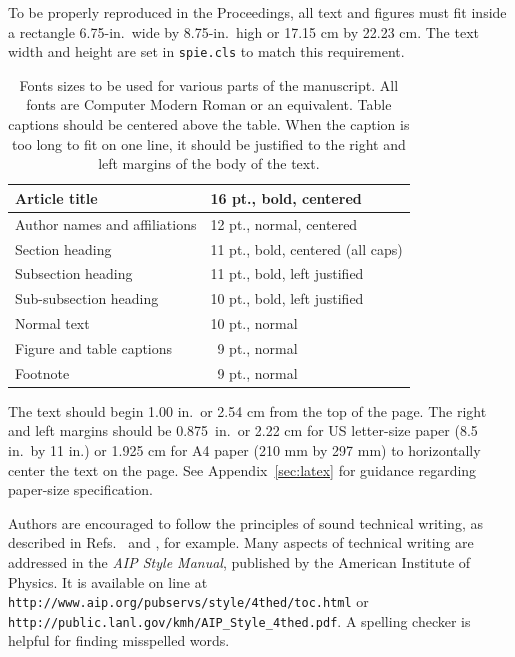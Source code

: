 \documentclass[a4paper]{spie}  %
\begin{document}
To be properly reproduced in the Proceedings, all text and figures must fit inside a rectangle 6.75-in.\ wide by 8.75-in.\ high or 17.15 cm by 22.23 cm.  The text width and height are set in {\tt spie.cls} to match this requirement.
\begin{table}[h]
\caption{Fonts sizes to be used for various parts of the manuscript.  All fonts are Computer Modern Roman or an equivalent.  Table captions should be centered above the table.  When the caption is too long to fit on one line, it should be justified to the right and left margins of the body of the text.} 
\label{tab:fonts}
\begin{center}       
\begin{tabular}{|l|l|} %
\hline
\rule[-1ex]{0pt}{3.5ex}  Article title & 16 pt., bold, centered  \\
\hline
\rule[-1ex]{0pt}{3.5ex}  Author names and affiliations & 12 pt., normal, centered   \\
\hline
\rule[-1ex]{0pt}{3.5ex}  Section heading & 11 pt., bold, centered (all caps)  \\
\hline
\rule[-1ex]{0pt}{3.5ex}  Subsection heading & 11 pt., bold, left justified  \\
\hline
\rule[-1ex]{0pt}{3.5ex}  Sub-subsection heading & 10 pt., bold, left justified  \\
\hline
\rule[-1ex]{0pt}{3.5ex}  Normal text & 10 pt., normal  \\
\hline
\rule[-1ex]{0pt}{3.5ex}  Figure and table captions & \, 9 pt., normal \\
\hline
\rule[-1ex]{0pt}{3.5ex}  Footnote & \, 9 pt., normal \\
\hline 
\end{tabular}
\end{center}
\end{table} 
The text should begin 1.00 in.\ or 2.54 cm from the top of the page.  The right and left margins should be 0.875~in.\ or 2.22 cm for US letter-size paper (8.5 in.\ by 11 in.) or 1.925 cm for A4 paper (210 mm by 297 mm) to horizontally center the text on the page.  See Appendix~\ref{sec:latex} for guidance regarding paper-size specification. 

Authors are encouraged to follow the principles of sound technical writing, as described in Refs.~ and , for example.  Many aspects of technical writing are addressed in the {\em AIP Style Manual}, published by the American Institute of Physics.  It is available on line at {\tt http://www.aip.org/pubservs/style/4thed/toc.html} or {\tt http://public.lanl.gov/kmh/AIP\verb+_+Style\verb+_+4thed.pdf}. A spelling checker is helpful for finding misspelled words. 
\end{document}
